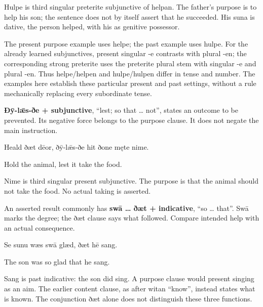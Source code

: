 Hulpe is third singular preterite subjunctive of helpan. The father’s purpose is to help his son; the sentence does not by itself assert that he succeeded. His suna is dative, the person helped, with his as genitive possessor.

The present purpose example uses helpe; the past example uses hulpe. For the already learned subjunctives, present singular -e contrasts with plural -en; the corresponding strong preterite uses the preterite plural stem with singular -e and plural -en. Thus helpe/\allowbreak{}helpen and hulpe/\allowbreak{}hulpen differ in tense and number. The examples here establish these particular present and past settings, without a rule mechanically replacing every subordinate tense.

\textbf{Ðȳ-lǣs-ðe + subjunctive}, “lest; so that … not”, states an outcome to be prevented. Its negative force belongs to the purpose clause. It does not negate the main instruction.

Heald ðæt dēor, ðȳ-lǣs-ðe hit ðone męte nime.

Hold the animal, lest it take the food.

Nime is third singular present subjunctive. The purpose is that the animal should not take the food. No actual taking is asserted.

An asserted result commonly has \textbf{swā … ðæt + indicative}, “so … that”. Swā marks the degree; the ðæt clause says what followed. Compare intended help with an actual consequence.

Se sunu wæs swā glæd, ðæt hē sang.

The son was so glad that he sang.

Sang is past indicative: the son did sing. A purpose clause would present singing as an aim. The earlier content clause, as after witan “know”, instead states what is known. The conjunction ðæt alone does not distinguish these three functions.

